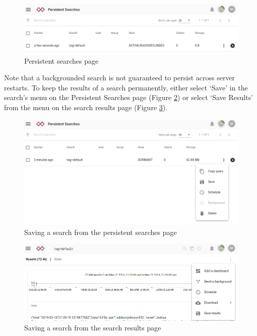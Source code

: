 \begin{figure}
	\includegraphics{images/persistent-searches.png}
	\caption{Persistent searches page}
	\label{fig:persistent-searches}
\end{figure}

Note that a backgrounded search is not guaranteed to persist across
server restarts. To keep the results of a search permanently, either
select `Save' in the search's menu on the Persistent Searches page (Figure \ref{fig:save-search}) or select `Save Results' from the menu on the search results page (Figure \ref{fig:save-search-menu}).

\begin{figure}
	\includegraphics{images/save-search.png}
	\caption{Saving a search from the persistent searches page}
	\label{fig:save-search}
\end{figure}


\begin{figure}
	\includegraphics{images/save-search-menu.png}
	\caption{Saving a search from the search results page}
	\label{fig:save-search-menu}
\end{figure}

